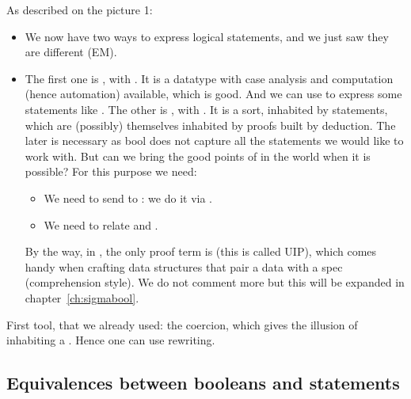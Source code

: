 As described on the picture 1:
\begin{itemize}
\item We now have two ways to express logical statements, and we just
  saw they are different (EM).
\item The first one is ,
  with .
  It is a datatype with case analysis and computation (hence automation)
  available, which is good. And we can use  to express some
  statements like . The other is , with
  . It is a sort, inhabited by statements, which are
  (possibly) themselves inhabited by proofs built by deduction. The
  later is necessary as bool does not capture all the statements we
  would like to work with. But can we bring the good points of
   in the  world when it is possible? For this purpose
  we need:
  \begin{itemize}
    \item We need to send  to : we do it via
      .
    \item We need to relate \C{&&} and \C{/\\}.
  \end{itemize}
  By the way, in , the only proof term is  (this
  is called UIP), which comes handy when crafting data structures that
  pair a data with a spec (comprehension style). We do not comment
  more but this will be expanded in chapter~\ref{ch:sigmabool}.
\end{itemize}

First tool, that we already used: the  coercion, which
gives the illusion of inhabiting a .
Hence one can use rewriting.

\subsection{Equivalences between booleans and  statements}

